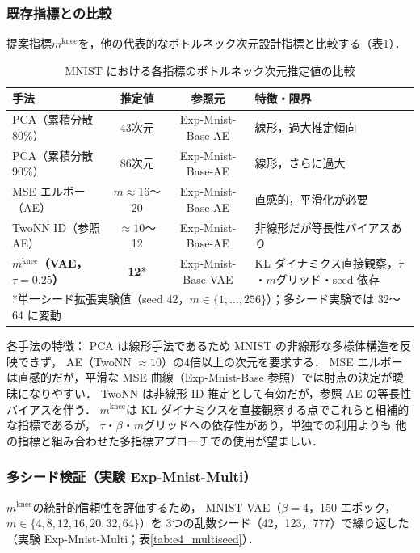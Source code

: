 \documentclass[11pt,a4paper]{jsarticle}
\newcommand{\mknee}{m^{\mathrm{knee}}}
\begin{document}
\subsubsection{既存指標との比較}\label{sec:exp_comparison}

提案指標$\mknee$を，他の代表的なボトルネック次元設計指標と比較する（表\ref{tab:method_comparison}）．

\begin{table}[H]
\centering
\caption{MNIST における各指標のボトルネック次元推定値の比較}
\label{tab:method_comparison}
\small
\begin{tabular}{lccl}
\toprule
手法 & 推定値 & 参照元 & 特徴・限界 \\
\midrule
PCA（累積分散80\%） & 43次元 & Exp-Mnist-Base-AE & 線形，過大推定傾向 \\
PCA（累積分散90\%） & 86次元 & Exp-Mnist-Base-AE & 線形，さらに過大 \\
MSE エルボー（AE） & $m \approx 16$〜20 & Exp-Mnist-Base-AE & 直感的，平滑化が必要 \\
TwoNN ID（参照AE） & $\approx 10$〜12 & Exp-Mnist-Base-AE & 非線形だが等長性バイアスあり \\
\textbf{$\mknee$（VAE，$\tau=0.25$）} & \textbf{12}* & Exp-Mnist-Base-VAE & KL ダイナミクス直接観察，$\tau$・$m$グリッド・seed 依存 \\
\multicolumn{4}{l}{*単一シード拡張実験値（seed 42，$m \in \{1,\ldots,256\}$）；多シード実験では 32〜64 に変動} \\
\bottomrule
\end{tabular}
\end{table}

各手法の特徴：
PCA は線形手法であるため MNIST の非線形な多様体構造を反映できず，
AE（TwoNN $\approx 10$）の4倍以上の次元を要求する．
MSE エルボーは直感的だが，平滑な MSE 曲線（Exp-Mnist-Base 参照）では肘点の決定が曖昧になりやすい．
TwoNN は非線形 ID 推定として有効だが，参照 AE の等長性バイアスを伴う．
$\mknee$は KL ダイナミクスを直接観察する点でこれらと相補的な指標であるが，
$\tau$・$\beta$・$m$グリッドへの依存性があり，単独での利用よりも
他の指標と組み合わせた多指標アプローチでの使用が望ましい．

\subsubsection{多シード検証（実験 Exp-Mnist-Multi）}\label{sec:exp_multiseed}

$\mknee$の統計的信頼性を評価するため，
MNIST VAE（$\beta = 4$，150 エポック，$m \in \{4,8,12,16,20,32,64\}$）を
3つの乱数シード（42，123，777）で繰り返した（実験 Exp-Mnist-Multi；表\ref{tab:e4_multiseed}）．
\end{document}
